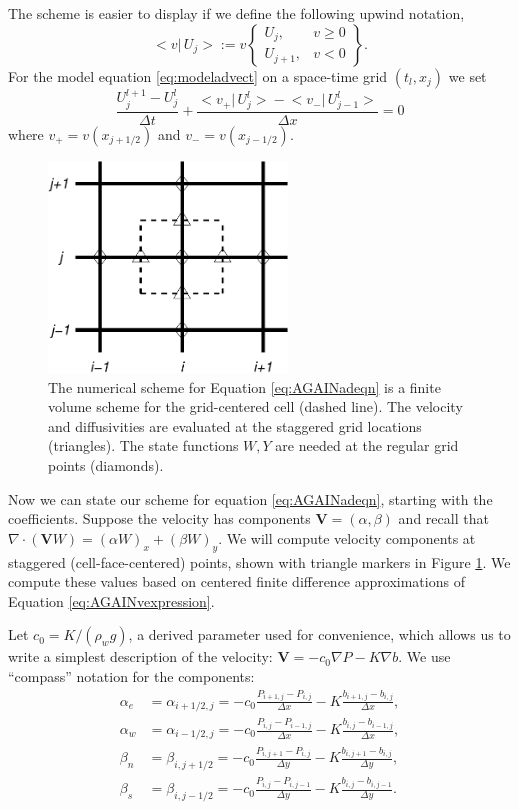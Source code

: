 \documentclass[12pt,final]{amsart}%
\newcommand\bV{\mathbf{V}}
\newcommand{\Div}{\nabla\cdot}
\newcommand{\grad}{\nabla}
\begin{document}
The scheme is easier to display if we define the following upwind notation,
\newcommand{\up}[2]{\big<#1\big|\,#2\big>}
	$$\up{v}{U_j} := v \begin{Bmatrix} U_j, & v \ge 0 \\ U_{j+1}, & v < 0 \end{Bmatrix}.$$
For the model equation \eqref{eq:modeladvect} on a space-time grid $(t_l,x_j)$ we set
\begin{equation}\label{eq:modelfdadvect}
\frac{U_j^{l+1} - U_j^l}{\Delta t} + \frac{\up{v_+}{U_j^l} - \up{v_-}{U_{j-1}^l}}{\Delta x} = 0
\end{equation}
where $v_+ = v(x_{j+1/2})$ and $v_-=v(x_{j-1/2})$.

\begin{figure}[ht]
\centering
\includegraphics[width=2.5in,keepaspectratio=true]{figs/diffstencil}
\bigskip
\caption{The numerical scheme for Equation \eqref{eq:AGAINadeqn} is a finite volume scheme for the grid-centered cell (dashed line).  The velocity and diffusivities are evaluated at the staggered grid locations (triangles).  The state functions $W,Y$ are needed at the regular grid points (diamonds).}
\label{fig:stencil}
\end{figure}

Now we can state our scheme for equation \eqref{eq:AGAINadeqn}, starting with the coefficients.  Suppose the velocity has components $\bV = (\alpha,\beta)$ and recall that $\Div \left(\bV W\right) = (\alpha W)_x + (\beta W)_y$.  We will compute velocity components at staggered (cell-face-centered) points, shown with triangle markers in Figure \ref{fig:stencil}.  We compute these values based on centered finite difference approximations of Equation \eqref{eq:AGAINvexpression}.

Let $c_0=K/(\rho_w g)$, a derived parameter used for convenience, which allows us to write a simplest description of the velocity:  $\bV = - c_0 \grad P - K \grad b$.  We use ``compass'' notation for the components:
\begin{align*}
\alpha_e &= \alpha_{i+1/2,j} = - c_0 \frac{P_{i+1,j}-P_{i,j}}{\Delta x} - K \frac{b_{i+1,j}-b_{i,j}}{\Delta x}, \\
\alpha_w &= \alpha_{i-1/2,j} = - c_0 \frac{P_{i,j}-P_{i-1,j}}{\Delta x} - K \frac{b_{i,j}-b_{i-1,j}}{\Delta x}, \\
\beta_n  &= \beta_{i,j+1/2} = - c_0 \frac{P_{i,j+1}-P_{i,j}}{\Delta y} - K \frac{b_{i,j+1}-b_{i,j}}{\Delta y}, \\
\beta_s  &= \beta_{i,j-1/2} = - c_0 \frac{P_{i,j}-P_{i,j-1}}{\Delta y} - K \frac{b_{i,j}-b_{i,j-1}}{\Delta y}.
\end{align*}
\end{document}
